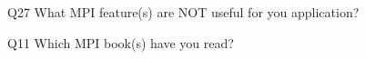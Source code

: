 \begin{description}%
\item{Q27} What MPI feature(s) are NOT useful for you application?%
\item{Q11} Which MPI book(s) have you read?%
\end{description}%
